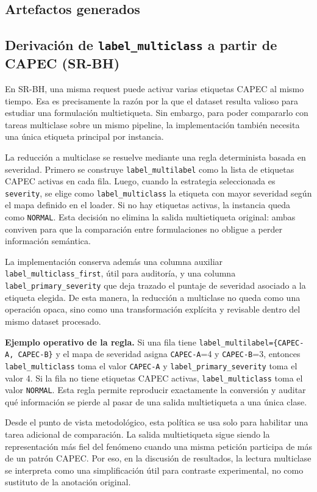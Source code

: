 \documentclass[12pt,oneside]{report}
\begin{document}
\subsection{Artefactos generados}


\subsection{Derivación de \texttt{label\_multiclass} a partir de CAPEC (SR-BH)}
En SR-BH, una misma request puede activar varias etiquetas CAPEC al mismo tiempo. Esa es precisamente la razón por la que el dataset resulta valioso para estudiar una formulación multietiqueta. Sin embargo, para poder compararlo con tareas multiclase sobre un mismo pipeline, la implementación también necesita una única etiqueta principal por instancia.

La reducción a multiclase se resuelve mediante una regla determinista basada en severidad. Primero se construye \texttt{label\_multilabel} como la lista de etiquetas CAPEC activas en cada fila. Luego, cuando la estrategia seleccionada es \texttt{severity}, se elige como \texttt{label\_multiclass} la etiqueta con mayor severidad según el mapa definido en el loader. Si no hay etiquetas activas, la instancia queda como \texttt{NORMAL}. Esta decisión no elimina la salida multietiqueta original: ambas conviven para que la comparación entre formulaciones no obligue a perder información semántica.

La implementación conserva además una columna auxiliar \texttt{label\_multiclass\_first}, útil para auditoría, y una columna \texttt{label\_primary\_severity} que deja trazado el puntaje de severidad asociado a la etiqueta elegida. De esta manera, la reducción a multiclase no queda como una operación opaca, sino como una transformación explícita y revisable dentro del mismo dataset procesado.

\textbf{Ejemplo operativo de la regla.} Si una fila tiene \texttt{label\_multilabel=\{CAPEC-A, CAPEC-B\}} y el mapa de severidad asigna \texttt{CAPEC-A}=4 y \texttt{CAPEC-B}=3, entonces \texttt{label\_multiclass} toma el valor \texttt{CAPEC-A} y \texttt{label\_primary\_severity} toma el valor 4. Si la fila no tiene etiquetas CAPEC activas, \texttt{label\_multiclass} toma el valor \texttt{NORMAL}. Esta regla permite reproducir exactamente la conversión y auditar qué información se pierde al pasar de una salida multietiqueta a una única clase.

Desde el punto de vista metodológico, esta política se usa solo para habilitar una tarea adicional de comparación. La salida multietiqueta sigue siendo la representación más fiel del fenómeno cuando una misma petición participa de más de un patrón CAPEC. Por eso, en la discusión de resultados, la lectura multiclase se interpreta como una simplificación útil para contraste experimental, no como sustituto de la anotación original.
\end{document}
